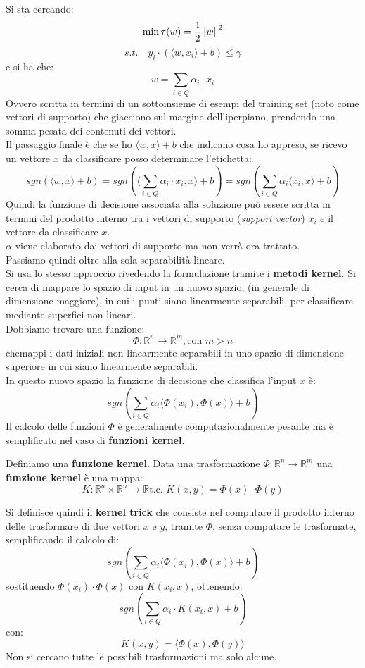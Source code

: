 \documentclass[a4paper,12pt, oneside]{book}
\begin{document}
Si sta cercando:
\[\min \tau(w)=\frac{1}{2}\norm{w}^2\]
\[s.t.\quad y_i\cdot(\langle w,x_i\rangle+b)\leq \gamma\]
e si ha che:
\[w=\sum_{i\in Q}\alpha_i\cdot x_i\]
Ovvero scritta in termini di un sottoinsieme di esempi del training set (noto
come vettori di supporto) che giacciono sul margine dell’iperpiano, prendendo
una somma pesata dei contenuti dei vettori.\\
Il passaggio finale è che se ho $\langle w,x\rangle+b$ che indicano cosa ho
appreso, se ricevo un vettore $x$ da classificare posso determinare l'etichetta:
\[sgn(\langle w,x\rangle+b)=sgn\left(\Big\langle\sum_{i\in Q}\alpha_i\cdot
    x_i,x\Big\rangle +b\right)=sgn\left(\sum_{i\in Q}\alpha_i\langle x_i,x\rangle
    +b\right)\]
Quindi la funzione di decisione associata alla soluzione può essere scritta in
termini del prodotto interno tra i vettori di supporto (\textit{support vector})
$x_i$ e il vettore da classificare $x$.\\
$\alpha$ viene elaborato dai vettori di supporto ma non verrà ora trattato.\\
Passiamo quindi oltre alla sola separabilità lineare.\\
Si usa lo stesso approccio rivedendo la formulazione tramite i \textbf{metodi
  kernel}. Si cerca di mappare lo spazio di input in un nuovo spazio, (in
generale di dimensione maggiore), in cui i punti siano linearmente separabili,
per classificare mediante superfici non lineari.\\
Dobbiamo trovare una funzione:
\[\Phi:\mathbb{R}^n\to \mathbb{R}^m,\mbox{con }m>n\]
chemappi i dati iniziali non linearmente separabili in uno spazio di dimensione
superiore in cui siano linearmente separabili.\\
In questo nuovo spazio la funzione di decisione che classifica l'input $x$ è:
\[sgn\left(\sum_{i\in Q}\alpha_i\langle \Phi(x_i),\Phi(x)\rangle+b\right)\]
Il calcolo delle funzioni $\Phi$ è generalmente computazionalmente pesante ma è
semplificato nel caso di \textbf{funzioni kernel}.
\begin{definizione}
  Definiamo una \textbf{funzione kernel}. Data una trasformazione
  $\Phi:\mathbb{R}^n\to \mathbb{R}^m$ una \textbf{funzione kernel} è una mappa:
  \[K:\mathbb{R}^n\times \mathbb{R}^n\to \mathbb{R}\mbox{
      t.c. }K(x,y)=\Phi(x)\cdot \Phi(y)\]
\end{definizione}
\begin{definizione}
  Si definisce quindi il \textbf{kernel trick} che consiste nel computare il
  prodotto interno delle trasformare di due vettori $x$ e $y$, tramite $\Phi$,
  senza computare le trasformate, semplificando il calcolo di:
  \[sgn\left(\sum_{i\in Q}\alpha_i\langle \Phi(x_i),\Phi(x)\rangle+b\right)\]
  sostituendo $\Phi(x_i)\cdot\Phi(x)$ con $K(x_i,x)$, ottenendo:
  \[sgn\left(\sum_{i\in Q}\alpha_i\cdot K(x_i,x)+b\right)\]
  con:
  \[K(x,y)=\langle \Phi(x),\Phi(y)\rangle\]
  Non si cercano tutte le possibili trasformazioni ma solo alcune.
\end{definizione}
\end{document}
